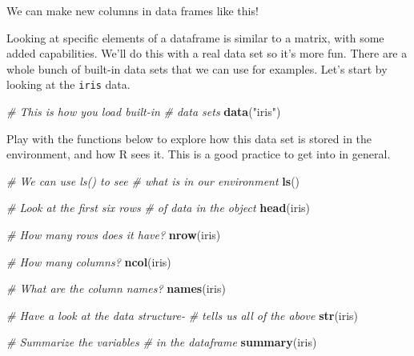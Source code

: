 \documentclass[
]{book}
\newenvironment{Shaded}{\begin{snugshade}}{\end{snugshade}}
\newcommand{\CommentTok}[1]{\textcolor[rgb]{0.56,0.35,0.01}{\textit{#1}}}
\newcommand{\KeywordTok}[1]{\textcolor[rgb]{0.13,0.29,0.53}{\textbf{#1}}}
\newcommand{\NormalTok}[1]{#1}
\newcommand{\OperatorTok}[1]{\textcolor[rgb]{0.81,0.36,0.00}{\textbf{#1}}}
\newcommand{\StringTok}[1]{\textcolor[rgb]{0.31,0.60,0.02}{#1}}
\begin{document}
We can make new columns in data frames like this!

\begin{Shaded}
\end{Shaded}

Looking at specific elements of a dataframe is similar to a matrix, with some added capabilities. We'll do this with a real data set so it's more fun. There are a whole bunch of built-in data sets that we can use for examples. Let's start by looking at the \texttt{iris} data.

\begin{Shaded}
\begin{Highlighting}[]
\CommentTok{# This is how you load built-in}
\CommentTok{# data sets}
\KeywordTok{data}\NormalTok{(}\StringTok{"iris"}\NormalTok{)}
\end{Highlighting}
\end{Shaded}

Play with the functions below to explore how this data set is stored in the environment, and how R sees it. This is a good practice to get into in general.

\begin{Shaded}
\begin{Highlighting}[]
\CommentTok{# We can use ls() to see}
\CommentTok{# what is in our environment}
\KeywordTok{ls}\NormalTok{()}

\CommentTok{# Look at the first six rows}
\CommentTok{# of data in the object}
\KeywordTok{head}\NormalTok{(iris)}

\CommentTok{# How many rows does it have?}
\KeywordTok{nrow}\NormalTok{(iris)}

\CommentTok{# How many columns?}
\KeywordTok{ncol}\NormalTok{(iris)}

\CommentTok{# What are the column names?}
\KeywordTok{names}\NormalTok{(iris)}

\CommentTok{# Have a look at the data structure-}
\CommentTok{# tells us all of the above}
\KeywordTok{str}\NormalTok{(iris)}

\CommentTok{# Summarize the variables}
\CommentTok{# in the dataframe}
\KeywordTok{summary}\NormalTok{(iris)}
\end{Highlighting}
\end{Shaded}
\end{document}

